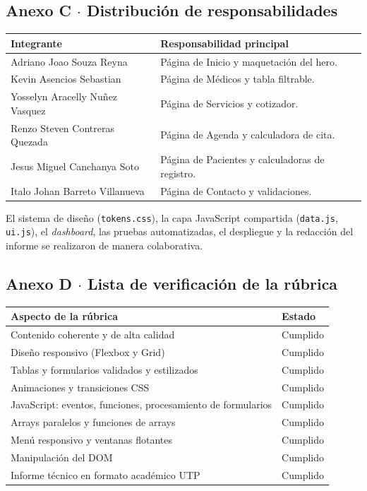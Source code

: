 \documentclass[11pt,a4paper]{article}
\newcommand{\thead}[1]{\textbf{\color{white}#1}}
\newcommand{\hrow}{\rowcolor{navy}}
\begin{document}
\subsection*{Anexo C $\cdot$ Distribución de responsabilidades}
\begin{center}
\begin{tabularx}{\textwidth}{l Y}
\hrow \thead{Integrante} & \thead{Responsabilidad principal} \\
\midrule
Adriano Joao Souza Reyna & Página de Inicio y maquetación del hero. \\
Kevin Asencios Sebastian & Página de Médicos y tabla filtrable. \\
Yosselyn Aracelly Nuñez Vasquez & Página de Servicios y cotizador. \\
Renzo Steven Contreras Quezada & Página de Agenda y calculadora de cita. \\
Jesus Miguel Canchanya Soto & Página de Pacientes y calculadoras de registro. \\
Italo Johan Barreto Villanueva & Página de Contacto y validaciones. \\
\bottomrule
\end{tabularx}
\end{center}
El sistema de diseño (\texttt{tokens.css}), la capa JavaScript compartida (\texttt{data.js}, \texttt{ui.js}), el \emph{dashboard}, las pruebas automatizadas, el despliegue y la redacción del informe se realizaron de manera colaborativa.

\subsection*{Anexo D $\cdot$ Lista de verificación de la rúbrica}
\begin{center}
\begin{tabularx}{\textwidth}{Y l}
\hrow \thead{Aspecto de la rúbrica} & \thead{Estado} \\
\midrule
Contenido coherente y de alta calidad & Cumplido \\
Diseño responsivo (Flexbox y Grid) & Cumplido \\
Tablas y formularios validados y estilizados & Cumplido \\
Animaciones y transiciones CSS & Cumplido \\
JavaScript: eventos, funciones, procesamiento de formularios & Cumplido \\
Arrays paralelos y funciones de arrays & Cumplido \\
Menú responsivo y ventanas flotantes & Cumplido \\
Manipulación del DOM & Cumplido \\
Informe técnico en formato académico UTP & Cumplido \\
\bottomrule
\end{tabularx}
\end{center}
\end{document}
